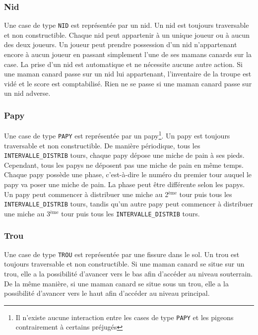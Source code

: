 \subsubsection{Nid}

Une case de type \texttt{NID} est représentée par un nid.
%
Un nid est toujours traversable et non constructible.
%
Chaque nid peut appartenir à un unique joueur ou à aucun des deux joueurs.
Un joueur peut prendre possession d'un nid n'appartenant encore à aucun joueur en
passant simplement l'une de ses mamans canards sur la case.
La prise d'un nid est automatique et ne nécessite aucune autre action.
Si une maman canard passe sur un nid lui appartenant, l'inventaire de la troupe
est vidé et le score est comptabilisé.
Rien ne se passe si une maman canard passe sur un nid adverse.

\subsubsection{Papy}

Une case de type \texttt{PAPY} est représentée par un papy\footnote{Il n'existe aucune interaction entre les cases de type \texttt{PAPY} et les pigeons contrairement à certains préjugés}.
%
Un papy est toujours traversable et non constructible.
%
De manière périodique, tous les \texttt{INTERVALLE\_DISTRIB} tours, chaque papy
dépose une miche de pain à ses pieds.
Cependant, tous les papys ne déposent pas une miche de pain en même temps.
Chaque papy possède une phase, c'est-à-dire le numéro du premier tour auquel le
papy va poser une miche de pain.
La phase peut être différente selon les papys. Un papy peut commencer à
distribuer une miche au 2$^{\text{ème}}$ tour puis tous les \texttt{INTERVALLE\_DISTRIB} tours,
tandis qu'un autre papy peut commencer à distribuer une miche au 3$^{\text{ème}}$ tour puis
tous les \texttt{INTERVALLE\_DISTRIB} tours.

\subsubsection{Trou}

Une case de type \texttt{TROU} est représentée par une fissure dans le sol.
%
Un trou est toujours traversable et non constructible.
%
Si une maman canard se situe sur un trou, elle a la possibilité d'avancer vers
le bas afin d'accéder au niveau souterrain.
De la même manière, si une maman canard se situe sous un trou, elle a la
possibilité d'avancer vers le haut afin d'accéder au niveau principal. 

